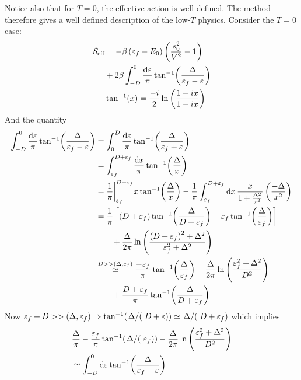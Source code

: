 Notice also that for $T=0$, the effective action is well defined. The method therefore gives a well defined description of the low-$T$ physics.
Consider the $T = 0$ case:
\begin{align}
	\tilde{\mathcal{S}}_{\text{eff}} &= -\beta\left(\varepsilon_f - E_0\right)\left(\frac{s_0^2}{V^2} -1\right) \\
	&+ 2\beta\int_{-D}^{0}\frac{\dd{\varepsilon}}{\pi}\tan[-1](\frac{\Delta}{\varepsilon_f-\varepsilon}) \\
	&\tan[-1](x) = \frac{-i}{2}\ln\left(\frac{1+ix}{1-ix}\right)
\end{align}
And the quantity 
\begin{align*}
	\int_{-D}^0\frac{\dd{\varepsilon}}{\pi}\tan[-1](\frac{\Delta}{\varepsilon_f-\varepsilon}) &= \int_{0}^D\frac{\dd{\varepsilon}}{\pi}\tan[-1](\frac{\Delta}{\varepsilon_f + \varepsilon}) \\
	&= \int_{\varepsilon_f}^{D + \varepsilon_f}\frac{\dd{x}}{\pi}\tan[-1](\frac{\Delta}{x}) \\
	&= \frac{1}{\pi}\bigg|_{\varepsilon_f}^{D + \varepsilon_f}x\tan[-1](\frac{\Delta}{x}) - \frac{1}{\pi}\int_{\varepsilon_f}^{D + \varepsilon_f}\dd{x} \frac{x}{1 +\frac{\Delta^2}{x^2}}\left(\frac{-\Delta}{x^2}\right) \\
	&= \frac{1}{\pi}\left[\left(D+\varepsilon_f\right)\tan[-1](\frac{\Delta}{D+\varepsilon_f}) - \varepsilon_f\tan[-1](\frac{\Delta}{\varepsilon_f})\right] \\
	&\qquad+ \frac{\Delta}{2\pi}\ln\left(\frac{\left(D+\varepsilon_f\right)^2 + \Delta^2}{\varepsilon_f^2 + \Delta^2}\right) \\
	&\stackrel{D>>(\Delta, \varepsilon_f)}{\simeq} \frac{-\varepsilon_f}{\pi}\tan[-1](\frac{\Delta}{\varepsilon_f}) - \frac{\Delta}{2\pi}\ln\left(\frac{\varepsilon_f^2 + \Delta^2}{D^2}\right) \\
	&\qquad +\frac{D+\varepsilon_f}{\pi}\tan[-1](\frac{\Delta}{D+\varepsilon_f})
\end{align*}
Now $\varepsilon_f + D >>(\Delta, \varepsilon_f) \Rightarrow \tan[-1](\flatfrac{\Delta}(D+\varepsilon)) \simeq \flatfrac{\Delta}(D+\varepsilon_f)$ which implies 
\begin{align*}
	&\frac{\Delta}{\pi} - \frac{\varepsilon_f}{\pi}\tan[-1](\flatfrac{\Delta}(\varepsilon_f)) - \frac{\Delta}{2\pi}\ln\left(\frac{\varepsilon_f^2 + \Delta^2}{D^2}\right) \\
	&\simeq \int_{-D}^0\dd{\varepsilon}\tan[-1](\frac{\Delta}{\varepsilon_f - \varepsilon})
\end{align*}


